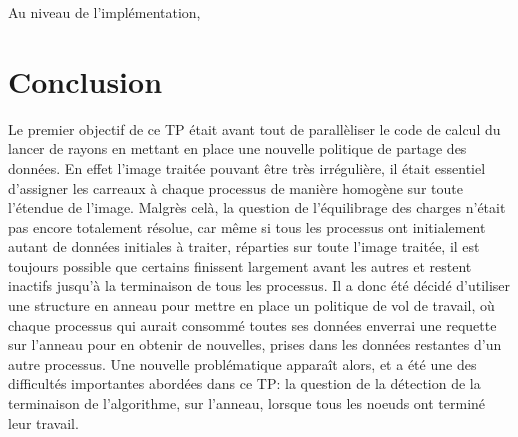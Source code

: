 \documentclass[a4paper,11pt]{article}
\begin{document}
Au niveau de l'implémentation, 


\section{Conclusion}
Le premier objectif de ce TP était avant tout de parallèliser le code de calcul du lancer de rayons en mettant en place une nouvelle politique de partage des données. En effet l'image traitée pouvant être très irrégulière, il était essentiel d'assigner les carreaux à chaque processus de manière homogène sur toute l'étendue de l'image. Malgrès celà, la question de l'équilibrage des charges n'était pas encore totalement résolue, car même si tous les processus ont initialement autant de données initiales à traiter, réparties sur toute l'image traitée, il est toujours possible que certains finissent largement avant les autres et restent inactifs jusqu'à la terminaison de tous les processus.  Il a donc été décidé d'utiliser une structure en anneau pour mettre en place un politique de vol de travail, où chaque processus qui aurait consommé toutes ses données enverrai une requette sur l'anneau pour en obtenir de nouvelles, prises dans les données restantes d'un autre processus. Une nouvelle problématique apparaît alors, et a été une des difficultés importantes abordées dans ce TP: la question de la détection de la terminaison de l'algorithme, sur l'anneau, lorsque tous les noeuds ont terminé leur travail.
\end{document}
